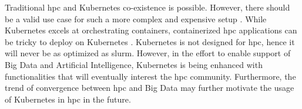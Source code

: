 \documentclass[12pt]{article}
\begin{document}
Traditional \gls{hpc} and Kubernetes co-existence is possible. However, there should be a valid use case for such a more complex and expensive setup \cite{cloudy-hutch}. While Kubernetes excels at orchestrating containers, containerized \gls{hpc} applications can be tricky to deploy on Kubernetes \cite{kubenetes-blog-meets-hpc}. Kubernetes is not designed for \gls{hpc}, hence it will never be as optimized as \gls{slurm}. However, in the effort to enable support of Big Data and Artificial Intelligence, Kubernetes is being enhanced with functionalities that will eventually interest the \gls{hpc} community. Furthermore, the trend of convergence between \gls{hpc} and Big Data may further motivate the usage of Kubernetes in \gls{hpc} in the future.







\end{document}
